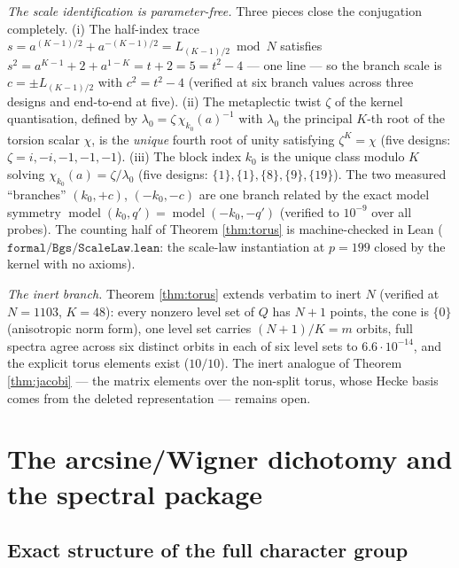 \documentclass[11pt,reqno]{amsart}
\theoremstyle{definition}
\begin{document}
\emph{The scale identification is parameter-free.}  Three pieces close the
conjugation completely.  (i) The half-index trace
$s=a^{(K-1)/2}+a^{-(K-1)/2}=L_{(K-1)/2}\bmod N$ satisfies
$s^2=a^{K-1}+2+a^{1-K}=t+2=5=t^2-4$ --- one line --- so the branch scale is
$c=\pm L_{(K-1)/2}$ with $c^2=t^2-4$ (verified at six branch values across
three designs and end-to-end at five).  (ii) The metaplectic twist
$\zeta$ of the kernel quantisation, defined by
$\lambda_0=\zeta\,\chi_{k_0}(a)^{-1}$ with $\lambda_0$ the principal $K$-th
root of the torsion scalar $\chi$, is the \emph{unique} fourth root of unity
satisfying $\zeta^K=\chi$ (five designs: $\zeta=i,-i,-1,-1,-1$).  (iii) The
block index $k_0$ is the unique class modulo $K$ solving
$\chi_{k_0}(a)=\zeta/\lambda_0$ (five designs: $\{1\},\{1\},\{8\},\{9\},
\{19\}$).  The two measured ``branches'' $(k_0,+c)$, $(-k_0,-c)$ are one
branch related by the exact model symmetry
$\operatorname{model}(k_0,q')=\operatorname{model}(-k_0,-q')$ (verified to
$10^{-9}$ over all probes).  The counting half of Theorem \ref{thm:torus} is
machine-checked in Lean ($\texttt{formal/Bgs/ScaleLaw.lean}$: the scale-law
instantiation at $p=199$ closed by the kernel with no axioms).

\emph{The inert branch.}  Theorem \ref{thm:torus} extends verbatim to
inert $N$ (verified at $N=1103$, $K=48$): every nonzero level set of $Q$ has
$N+1$ points, the cone is $\{0\}$ (anisotropic norm form), one level set
carries $(N+1)/K=m$ orbits, full spectra agree across six distinct orbits in
each of six level sets to $6.6\cdot10^{-14}$, and the explicit torus
elements exist ($10/10$).  The inert analogue of Theorem
\ref{thm:jacobi} --- the matrix elements over the non-split torus, whose
Hecke basis comes from the deleted representation --- remains open.



\section{The arcsine/Wigner dichotomy and the spectral package}
\label{sec:r91}

\subsection{Exact structure of the full character group}
\end{document}
